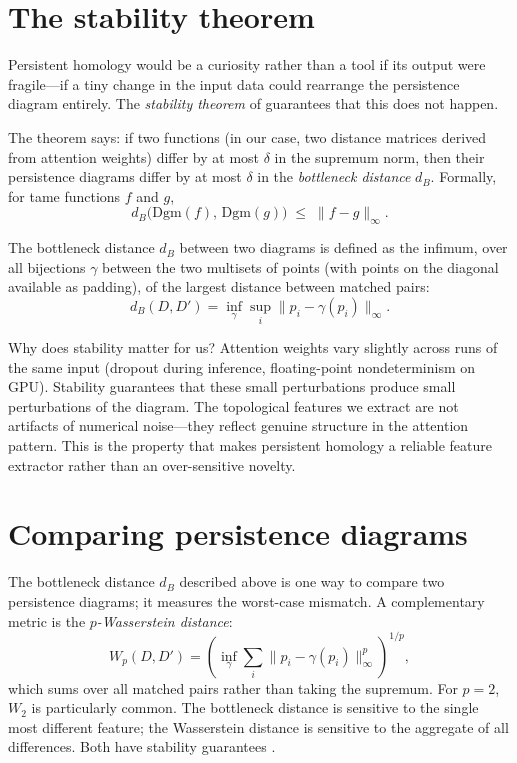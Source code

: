 \section{The stability theorem}
\label{sec:stability}

Persistent homology would be a curiosity rather than a tool if its
output were fragile---if a tiny change in the input data could
rearrange the persistence diagram entirely.
The \emph{stability theorem} of \textcite{cohensteiner2007} guarantees
that this does not happen.

The theorem says: if two functions (in our case, two distance matrices
derived from attention weights) differ by at most $\delta$ in the
supremum norm, then their persistence diagrams differ by at most
$\delta$ in the \emph{bottleneck distance} $d_B$.
Formally, for tame functions $f$ and $g$,
\[
  d_B\bigl(\mathrm{Dgm}(f),\, \mathrm{Dgm}(g)\bigr) \;\leq\; \|f - g\|_\infty.
\]

The bottleneck distance $d_B$ between two diagrams is defined as the
infimum, over all bijections $\gamma$ between the two multisets of
points (with points on the diagonal available as padding), of the
largest distance between matched pairs:
\[
  d_B(D, D') = \inf_\gamma \sup_i \| p_i - \gamma(p_i) \|_\infty.
\]

Why does stability matter for us?
Attention weights vary slightly across runs of the same input
(dropout during inference, floating-point nondeterminism on GPU).
Stability guarantees that these small perturbations produce
small perturbations of the diagram.
The topological features we extract are not artifacts of numerical
noise---they reflect genuine structure in the attention pattern.
This is the property that makes persistent homology a reliable feature
extractor rather than an over-sensitive novelty.


\section{Comparing persistence diagrams}
\label{sec:comparing-diagrams}

The bottleneck distance $d_B$ described above is one way to compare two
persistence diagrams; it measures the worst-case mismatch.
A complementary metric is the \emph{$p$-Wasserstein distance}:
\[
  W_p(D, D') = \left(\inf_\gamma \sum_i \| p_i - \gamma(p_i)
  \|_\infty^p \right)^{1/p},
\]
which sums over all matched pairs rather than taking the supremum.
For $p = 2$, $W_2$ is particularly common.
The bottleneck distance is sensitive to the single most different
feature; the Wasserstein distance is sensitive to the aggregate of all
differences.
Both have stability guarantees \parencite{cohensteiner2007}.

